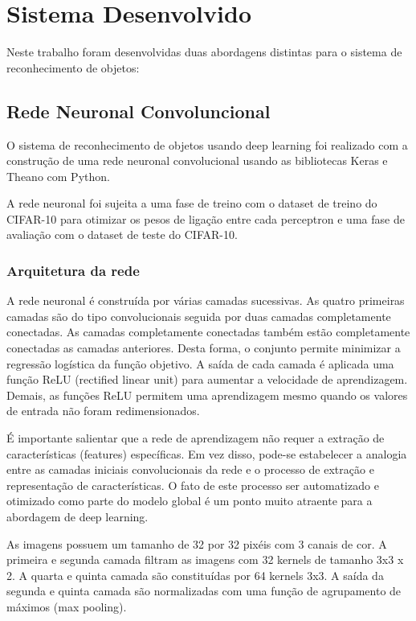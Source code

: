 \documentclass[extendedabs]{vcom}
\begin{document}
\section{Sistema Desenvolvido}
Neste trabalho foram desenvolvidas duas abordagens distintas para o sistema de reconhecimento de objetos:

\subsection{Rede Neuronal Convoluncional}
O sistema de reconhecimento de objetos usando deep learning foi realizado com a construção de uma rede neuronal convolucional usando as bibliotecas Keras e Theano com Python.

A rede neuronal foi sujeita a uma fase de treino com o dataset de treino do CIFAR-10 para otimizar os pesos de ligação entre cada perceptron e uma fase de avaliação com o dataset de teste do CIFAR-10.

\subsubsection{Arquitetura da rede}
A rede neuronal é construída por várias camadas sucessivas. As quatro primeiras camadas são do tipo convolucionais seguida por duas camadas completamente conectadas. As camadas completamente conectadas também estão completamente conectadas as camadas anteriores. Desta forma, o conjunto permite minimizar a regressão logística da função objetivo. A saída de cada camada é aplicada uma função ReLU (rectified linear unit) para aumentar a velocidade de aprendizagem. Demais, as funções ReLU permitem uma aprendizagem mesmo quando os valores de entrada não foram redimensionados.

É importante salientar que a rede de aprendizagem não requer a extração de características (features) específicas. Em vez disso, pode-se estabelecer a analogia entre as camadas iniciais convolucionais da rede e o processo de extração e representação de características. O fato de este processo ser automatizado e otimizado como parte do modelo global é um ponto muito atraente para a abordagem de deep learning.

As imagens possuem um tamanho de 32 por 32 pixéis com 3 canais de cor. A primeira e segunda camada filtram as imagens com 32 kernels de tamanho 3x3 x 2. A quarta e quinta camada são constituídas por 64 kernels 3x3. A saída da segunda e quinta camada são normalizadas com uma função de agrupamento de máximos (max pooling).
\end{document}
